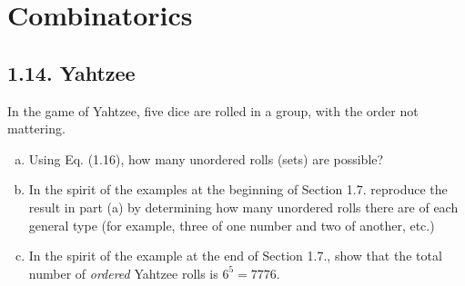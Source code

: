 \chapter{Combinatorics}

\section*{1.14. Yahtzee}
In the game of Yahtzee, five dice are rolled in a group, with the order not mattering.

\begin{enumerate}[(a)]
    \item Using Eq. (1.16), how many unordered rolls (sets) are possible?

    \item In the spirit of the examples at the beginning of Section 1.7. reproduce the
        result in part (a) by determining how many unordered rolls there are
        of each general type (for example, three of one number and two of another, etc.)

    \item In the spirit of the example at the end of Section 1.7., show that the total
        number of \emph{ordered} Yahtzee rolls is $6^5 = 7776$.
\end{enumerate}

\vspace{2em}

